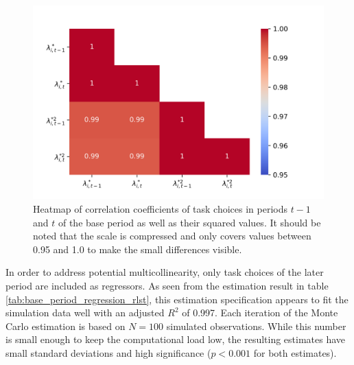 \documentclass[../main.tex]{subfiles}
\begin{document}
\begin{figure}[!htbp]
	\centering
	\includegraphics[scale=0.75]{./FIG/corr_heatmap.png} 
	\caption{Heatmap of correlation coefficients of task choices in periods $t-1$ and $t$ of the base period as well as their squared values. It should be noted that the scale is compressed and only covers values between 0.95 and 1.0 to make the small differences visible.}
	\label{fig:corr_heatmap}
\end{figure}
In order to address potential multicollinearity, only task choices of the later period are included as regressors. 
As seen from the estimation result in table \ref{tab:base_period_regression_rlst}, this estimation specification appears to fit the simulation data well with an adjusted $R^2$ of 0.997. Each iteration of the Monte Carlo estimation is based on $N=100$ simulated observations. While this number is small enough to keep the computational load low, the resulting estimates have small standard deviations and high significance ($p<0.001$ for both estimates).
\\
\end{document}
